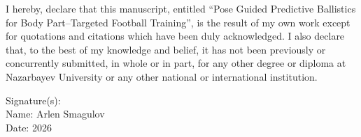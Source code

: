 \thispagestyle{empty}

\begin{framed}
I hereby, declare that this manuscript, entitled ``Pose Guided Predictive Ballistics for Body Part--Targeted Football Training'', is the result of my own work except for quotations and citations which have been duly acknowledged. I also declare that, to the best of my knowledge and belief, it has not been previously or concurrently submitted, in whole or in part, for any other degree or diploma at Nazarbayev University or any other national or international institution.
\end{framed}

\vspace{1cm}

Signature(s): \underline{\hspace{5cm}} \\[0.5cm]
Name: Arlen Smagulov \\[0.5cm]
Date: 2026
